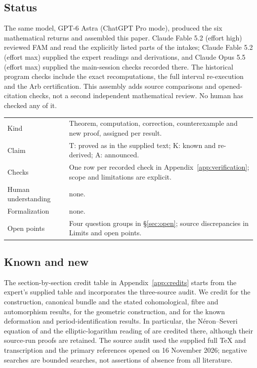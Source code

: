 \documentclass[11pt,a4paper]{article}
\theoremstyle{plain}
\theoremstyle{definition}
\begin{document}
\subsection*{Status}
The same model, GPT-6 Astra (ChatGPT Pro mode), produced the six mathematical returns and assembled this paper. Claude Fable 5.2 (effort high) reviewed FAM and read the explicitly listed parts of the intakes; Claude Fable 5.2 (effort max) supplied the expert readings and derivations, and Claude Opus 5.5 (effort max) supplied the main-session checks recorded there. The historical program checks include the exact recomputations, the full interval re-execution and the Arb certification. This assembly adds source comparisons and opened-citation checks, not a second independent mathematical review. No human has checked any of it.
\begin{center}\small
\begin{tabularx}{\linewidth}{@{}lY@{}}
\toprule Kind & Theorem, computation, correction, counterexample and new proof, assigned per result.\\
Claim & T: proved as in the supplied text; K: known and re-derived; A: announced.\\
Checks & One row per recorded check in Appendix~\ref{app:verification}; scope and limitations are explicit.\\
Human understanding & none.\\
Formalization & none.\\
Open points & Four question groups in \S\ref{sec:open}; source discrepancies in Limits and open points.\\\bottomrule
\end{tabularx}
\end{center}

\subsection*{Known and new}
The section-by-section credit table in Appendix~\ref{app:credits} starts from the expert's supplied table and incorporates the three-source audit. We credit \cite[Main Theorem; Sections 3--9]{AC26} for the construction, canonical bundle and the stated cohomological, fibre and automorphism results, \cite[Sections 2--8]{E26} for the geometric construction, and \cite[Theorems 1.3, 1.4, 7.1 and 7.2]{DGKXv1} for the known deformation and period-identification results. In particular, the N\'eron--Severi equation of \cite[Lemma 9.2]{AC26} and the elliptic-logarithm reading of \cite[Remark 3.12]{AC26} are credited there, although their source-run proofs are retained. The source audit used the supplied full TeX and transcription and the primary references opened on 16 November 2026; negative searches are bounded searches, not assertions of absence from all literature.
\end{document}
